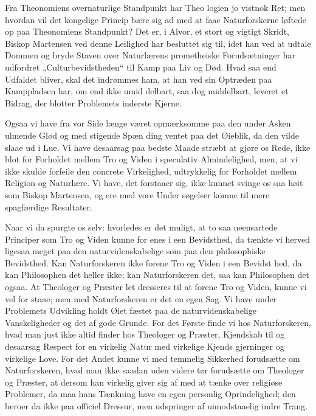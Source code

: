 \documentclass[12pt]{book}
\newcommand{\opage}[1]{\marginnote{\footnotesize\textit{[#1]}}}
\begin{document}
Fra Theonomiens overnaturlige Standpunkt har Theo\-%
logien jo vistnok Ret; men hvordan vil det kongelige Princip
bære sig ad med at faae Naturforskerne løftede op paa
Theonomiens Standpunkt? Det er, i Alvor, et stort og
vigtigt Skridt, Biskop Martensen ved denne Leilighed har
\opage{24}\setcounter{footnote}{0}%
besluttet sig til, idet han ved at udtale Dommen og bryde
Staven over Naturlærens prometheiske Forudsætninger har
udfordret „Culturbevidstheden“ til Kamp paa Liv og Død.
Hvad saa end Udfaldet bliver, skal det indrømmes ham, at han
ved sin Optræden paa Kamppladsen har, om end ikke umid\-%
delbart, saa dog middelbart, leveret et Bidrag, der blotter
Problemets inderste Kjerne.

Ogsaa vi have fra vor Side længe været opmærksomme
paa den under Asken ulmende Glød og med stigende Spæn\-%
ding ventet paa det Øieblik, da den vilde slaae ud i Lue.
Vi have desaarsag paa bedste Maade stræbt at gjøre os Rede,
ikke blot for Forholdet mellem Tro og Viden i speculativ
Almindelighed, men, at vi ikke skulde forfeile den concrete
Virkelighed, udtrykkelig for Forholdet mellem Religion og
Naturlære. Vi have, det forstaaer sig, ikke kunnet svinge os
saa høit som Biskop Martensen, og ere med vore Under\-%
søgelser komne til mere spagfærdige Resultater.

Naar vi da spurgte os selv: hvorledes er det muligt, at
to saa ueensartede Principer som Tro og Viden kunne for\-%
enes i een Bevidsthed, da tænkte vi herved ligesaa meget paa
den naturvidenskabelige som paa den philosophiske Bevidsthed.
Kan Naturforskeren ikke forene Tro og Viden i een Bevidst\-%
hed, da kan Philosophen det heller ikke; kan Naturforskeren det,
saa kan Philosophen det ogsaa. At Theologer og Præster
let dresseres til at forene Tro og Viden, kunne vi vel for\-%
staae; men med Naturforskeren er det en egen Sag. Vi
have under Problemets Udvikling holdt Øiet fæstet paa de
naturvidenskabelige Vanskeligheder og det af gode Grunde.
For det Første finde vi hos Naturforskeren, hvad man just
ikke altid finder hos Theologer og Præster, Kjendskab til og
desaarsag Respect for en virkelig Natur med virkelige Kjends\-%
gjerninger og virkelige Love. For det Andet kunne vi med
temmelig Sikkerhed forudsætte om Naturforskeren, hvad man
ikke saadan uden videre tør forudsætte om Theologer og
\opage{25}\setcounter{footnote}{0}%
Præster, at dersom han virkelig giver sig af med at tænke
over religiøse Problemer, da maa hans Tænkning have en
egen personlig Oprindelighed; den beroer da ikke paa officiel
Dressur, men udspringer af uimodstaaelig indre Trang.
\end{document}
